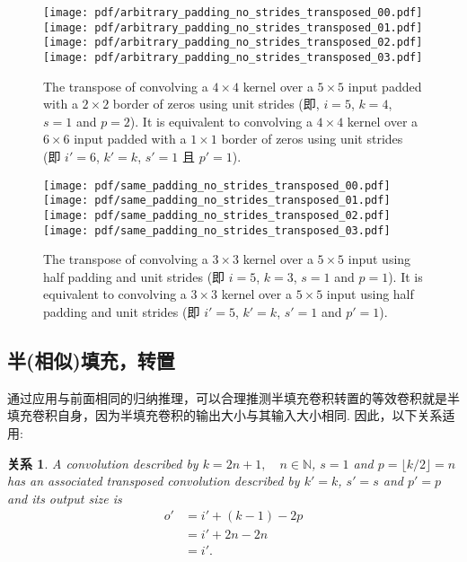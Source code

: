 \documentclass[notitlepage]{ctexrep}
\newtheorem{relationship}{关系}
\begin{document}
\begin{figure}[p]
    \centering
    \texttt{[image: pdf/arbitrary\_padding\_no\_strides\_transposed\_00.pdf]}
    \texttt{[image: pdf/arbitrary\_padding\_no\_strides\_transposed\_01.pdf]}
    \texttt{[image: pdf/arbitrary\_padding\_no\_strides\_transposed\_02.pdf]}
    \texttt{[image: pdf/arbitrary\_padding\_no\_strides\_transposed\_03.pdf]}
    \caption{\label{fig:arbitrary_padding_no_strides_transposed} The transpose
        of convolving a $4 \times 4$ kernel over a $5 \times 5$ input padded
        with a $2 \times 2$ border of zeros using unit strides (即, $i = 5$,
        $k = 4$, $s = 1$ and $p = 2$). It is equivalent to convolving a $4
        \times 4$ kernel over a $6 \times 6$ input padded with a $1 \times 1$
        border of zeros using unit strides (即 $i' = 6$, $k' = k$, $s' = 1$
        且 $p' = 1$).}
\end{figure}

\begin{figure}[p]
    \centering
    \texttt{[image: pdf/same\_padding\_no\_strides\_transposed\_00.pdf]}
    \texttt{[image: pdf/same\_padding\_no\_strides\_transposed\_01.pdf]}
    \texttt{[image: pdf/same\_padding\_no\_strides\_transposed\_02.pdf]}
    \texttt{[image: pdf/same\_padding\_no\_strides\_transposed\_03.pdf]}
    \caption{\label{fig:same_padding_no_strides_transposed} The transpose of
        convolving a $3 \times 3$ kernel over a $5 \times 5$ input using half
        padding and unit strides (即 $i = 5$, $k = 3$, $s = 1$ and $p = 1$).
        It is equivalent to convolving a $3 \times 3$ kernel over a $5 \times 5$
        input using half padding and unit strides (即 $i' = 5$, $k' = k$, $s'
        = 1$ and $p' = 1$).}
\end{figure}

\subsection{半(相似)填充，转置}

通过应用与前面相同的归纳推理，可以合理推测半填充卷积转置的等效卷积就是半填充卷积自身，因为半填充卷积的输出大小与其输入大小相同. 因此，以下关系适用:

\begin{relationship}\label{rel:half_padding_no_strides_transposed}
A convolution described by $k = 2n + 1, \quad n \in \mathbb{N}$, $s = 1$ and $p
= \lfloor k / 2 \rfloor = n$ has an associated transposed convolution described
by $k' = k$, $s' = s$ and $p' = p$ and its output size is
\begin{equation*}
\begin{split}
    o' &= i' + (k - 1) - 2p \\
       &= i' + 2n - 2n \\
       &= i'.
\end{split}
\end{equation*}
\end{relationship}
\end{document}
